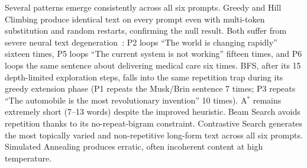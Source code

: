 \documentclass[12pt]{article}
\begin{document}
\vspace{12pt}

Several patterns emerge consistently across all six prompts. Greedy and Hill Climbing produce identical text on every prompt even with multi-token substitution and random restarts, confirming the null result. Both suffer from severe neural text degeneration~\cite{holtzman2020curious}: P2 loops ``The world is changing rapidly'' sixteen times, P5 loops ``The current system is not working'' fifteen times, and P6 loops the same sentence about delivering medical care six times. BFS, after its 15 depth-limited exploration steps, falls into the same repetition trap during its greedy extension phase (P1 repeats the Musk/Brin sentence 7 times; P3 repeats ``The automobile is the most revolutionary invention'' 10 times). A$^*$ remains extremely short (7--13 words) despite the improved heuristic. Beam Search avoids repetition thanks to its no-repeat-bigram constraint. Contrastive Search generates the most topically varied and non-repetitive long-form text across all six prompts. Simulated Annealing produces erratic, often incoherent content at high temperature.

	
	\newpage
	
	
	
\end{document}
